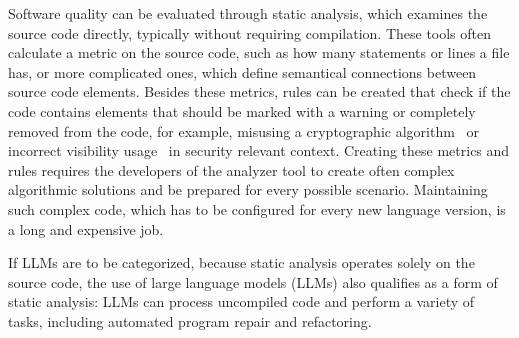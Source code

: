 Software quality can be evaluated through static analysis, which examines the source code directly, typically without requiring compilation.
These tools often calculate a metric on the source code, such as how many statements or lines a file has, or more complicated ones, which define semantical connections between source code elements.
Besides these metrics, rules can be created that check if the code contains elements that should be marked with a warning or completely removed from the code, for example, misusing a cryptographic algorithm~\cite{detect_misused_crypto} or incorrect visibility usage~\cite{implement_security_check_visibility} in security relevant context.
Creating these metrics and rules requires the developers of the analyzer tool to create often complex algorithmic solutions and be prepared for every possible scenario.
Maintaining such complex code, which has to be configured for every new language version, is a long and expensive job.

If LLMs are to be categorized, because static analysis operates solely on the source code, the use of large language models (LLMs) also qualifies as a form of static analysis: LLMs can process uncompiled code and perform a variety of tasks, including automated program repair and refactoring.
